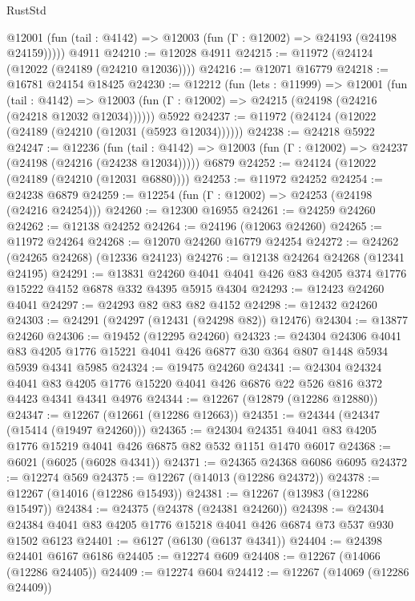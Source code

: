 \begin{lexlean}{RustStd}
\begin{coremodule}
      @12001 (fun (tail : @4142) => @12003 (fun (Γ : @12002) => @24193 (@24198 @24159)))))
    @4911
@24210 := @12028 @4911
@24215 := @11972 (@24124 (@12022 (@24189 (@24210 @12036))))
@24216 := @12071 @16779
@24218 := @16781 @24154 @18425
@24230 := @12212
    (fun (lets : @11999) =>
    @12001
      (fun (tail : @4142) =>
      @12003 (fun (Γ : @12002) => @24215 (@24198 (@24216 (@24218 @12032 @12034))))))
    @5922
@24237 := @11972 (@24124 (@12022 (@24189 (@24210 (@12031 (@5923 @12034))))))
@24238 := @24218 @5922
@24247 := @12236
    (fun (tail : @4142) => @12003 (fun (Γ : @12002) => @24237 (@24198 (@24216 (@24238 @12034)))))
    @6879
@24252 := @24124 (@12022 (@24189 (@24210 (@12031 @6880))))
@24253 := @11972 @24252
@24254 := @24238 @6879
@24259 := @12254 (fun (Γ : @12002) => @24253 (@24198 (@24216 @24254)))
@24260 := @12300 @16955
@24261 := @24259 @24260
@24262 := @12138 @24252
@24264 := @24196 (@12063 @24260)
@24265 := @11972 @24264
@24268 := @12070 @24260 @16779 @24254
@24272 := @24262 (@24265 @24268) (@12336 @24123)
@24276 := @12138 @24264 @24268 (@12341 @24195)
@24291 := @13831
    @24260
    @4041
    @4041
    @426
    @83
    @4205
    @374
    @1776
    @15222
    @4152
    @6878
    @332
    @4395
    @5915
    @4304
@24293 := @12423 @24260 @4041
@24297 := @24293 @82 @83 @82 @4152
@24298 := @12432 @24260
@24303 := @24291 (@24297 (@12431 (@24298 @82)) @12476)
@24304 := @13877 @24260
@24306 := @19452 (@12295 @24260)
@24323 := @24304
    @24306
    @4041
    @83
    @4205
    @1776
    @15221
    @4041
    @426
    @6877
    @30
    @364
    @807
    @1448
    @5934
    @5939
    @4341
    @5985
@24324 := @19475 @24260
@24341 := @24304
    @24324
    @4041
    @83
    @4205
    @1776
    @15220
    @4041
    @426
    @6876
    @22
    @526
    @816
    @372
    @4423
    @4341
    @4341
    @4976
@24344 := @12267 (@12879 (@12286 @12880))
@24347 := @12267 (@12661 (@12286 @12663))
@24351 := @24344 (@24347 (@15414 (@19497 @24260)))
@24365 := @24304 @24351 @4041 @83 @4205 @1776 @15219 @4041 @426 @6875 @82 @532 @1151 @1470 @6017
@24368 := @6021 (@6025 (@6028 @4341))
@24371 := @24365 @24368 @6086 @6095
@24372 := @12274 @569
@24375 := @12267 (@14013 (@12286 @24372))
@24378 := @12267 (@14016 (@12286 @15493))
@24381 := @12267 (@13983 (@12286 @15497))
@24384 := @24375 (@24378 (@24381 @24260))
@24398 := @24304 @24384 @4041 @83 @4205 @1776 @15218 @4041 @426 @6874 @73 @537 @930 @1502 @6123
@24401 := @6127 (@6130 (@6137 @4341))
@24404 := @24398 @24401 @6167 @6186
@24405 := @12274 @609
@24408 := @12267 (@14066 (@12286 @24405))
@24409 := @12274 @604
@24412 := @12267 (@14069 (@12286 @24409))

\end{coremodule}
\end{lexlean}
